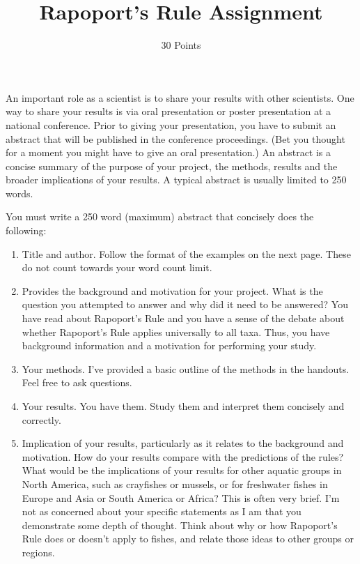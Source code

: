 \documentclass[11pt]{article}
\title{Rapoport's Rule Assignment}
\author{30 Points}
\date{}                                           %
\begin{document}
\maketitle
\thispagestyle{plain}

An important role as a scientist is to share your results with other
scientists. One way to share your results is via oral presentation or
poster presentation at a national conference. Prior to giving your
presentation, you have to submit an abstract that will be published in
the conference proceedings. (Bet you thought for a moment you might have
to give an oral presentation.) An abstract is a concise summary of the
purpose of your project, the methods, results and the broader
implications of your results. A typical abstract is usually limited to
250 words.

You must write a 250 word (maximum) abstract that concisely does the
following:

\begin{enumerate}
	\item Title and author. Follow the format of the examples on the next page.
These do not count towards your word count limit.

	\item Provides the background and motivation for your project. What
is the question you attempted to answer and why did it need to be
answered? You have read about Rapoport's Rule and you have a sense of
the debate about whether Rapoport's Rule applies universally to all
taxa. Thus, you have background information and a motivation for
performing your study.

	\item Your methods. I've provided a basic outline of the methods
in the handouts. Feel free to ask questions.

	\item Your results. You have them. Study them and interpret them
concisely and correctly.

	\item Implication of your results, particularly as it relates to
the background and motivation. How do your results compare with the
predictions of the rules? What would be the implications of your results
for other aquatic groups in North America, such as crayfishes or
mussels, or for freshwater fishes in Europe and Asia or South America or
Africa? This is often very brief. I'm not as concerned about your
specific statements as I am that you demonstrate some depth of thought.
Think about why or how Rapoport's Rule does or doesn't apply to fishes,
and relate those ideas to other groups or regions.

\end{enumerate}
\end{document}
